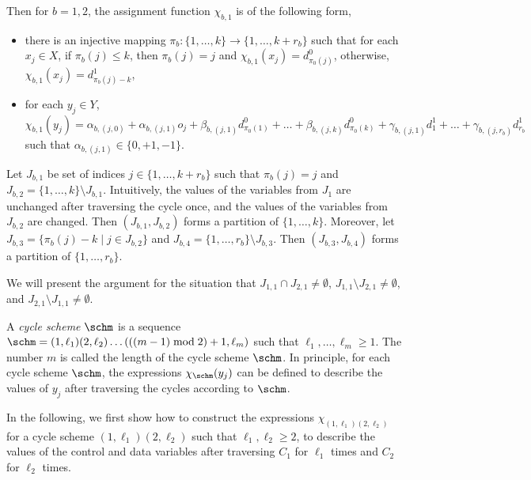 Then for $b=1,2$, the assignment function $\chi_{b,1}$ is of the following form,
\begin{itemize}
\item there is an injective mapping $\pi_b: \{1,\dots,k\} \rightarrow \{1,\dots, k+r_b\}$ such that for each $x_j \in X$, if $\pi_b(j) \le k$, then $\pi_b(j)=j$ and $\chi_{b,1}(x_j)=d^0_{\pi_0(j)}$, otherwise, $\chi_{b,1}(x_j)=d^1_{\pi_b(j)-k}$,
% 
\item for each $y_j \in Y$, $\chi_{b,1}(y_j) = \alpha_{b,(j,0)} + \alpha_{b,(j,1)} o_j + \beta_{b,(j,1)} d^0_{\pi_0(1)} + \dots + \beta_{b,(j,k)} d^0_{\pi_0(k)} + \gamma_{b,(j,1)} d^1_1 +\dots + \gamma_{b,(j,r_b)} d^1_{r_b}$ such that $\alpha_{b,(j,1)} \in \{0,+1,-1\}$.
\end{itemize}

Let $J_{b,1}$ be set of indices $j \in \{1,\dots,k+r_b\}$ such that $\pi_b(j)= j$ and $J_{b,2} = \{1,\dots,k\} \setminus J_{b,1}$. Intuitively, the values of the variables from $J_1$ are  unchanged after traversing the cycle once, and the values of the variables from  $J_{b,2}$ are changed. Then $(J_{b,1}, J_{b,2})$ forms a partition of $\{1,\dots,k\}$. Moreover, let $J_{b,3}=\{\pi_b(j)-k \mid j \in J_{b,2}\}$ and $J_{b,4} = \{1,\dots,r_b\} \setminus J_{b,3}$. Then $(J_{b,3}, J_{b,4})$ forms a partition of $\{1,\dots,r_b\}$.

We will present the argument for the situation that $J_{1,1} \cap J_{2,1} \neq \emptyset$, $J_{1,1} \setminus J_{2,1} \neq \emptyset$, and $J_{2,1} \setminus J_{1,1} \neq \emptyset$.

A \emph{cycle scheme} $\schm$ is a sequence $\schm=(1,\ell_1) (2, \ell_2 ) \dots (((m-1) \bmod 2)+1, \ell_m)$ such that $\ell_1,\dots, \ell_m \ge 1$. The number $m$ is called the length of the cycle scheme $\schm$. In principle, for each cycle scheme $\schm$, the expressions $\chi_{\schm}(y_j)$ can be defined to describe the values of $y_j$ after traversing the cycles according to $\schm$.


In the following, we first show how to construct the expressions $\chi_{(1,\ell_1)(2,\ell_2)}$ for a cycle scheme $(1,\ell_1)(2,\ell_2)$ such that $\ell_1,\ell_2 \ge 2$, to describe the values of the control and data variables after traversing $C_1$ for $\ell_1$ times and $C_2$ for $\ell_2$ times.

